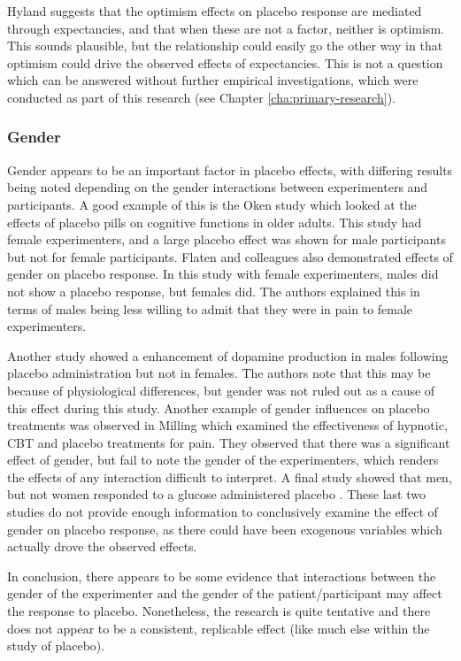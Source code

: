 Hyland suggests that the optimism effects on placebo response are mediated through expectancies, and that when these are not a factor, neither is optimism. This sounds plausible, but the relationship could easily go the other way in that optimism could drive the observed effects of expectancies. This is not a question which can be answered without further empirical investigations, which were conducted as part of this research (see Chapter \ref{cha:primary-research}). 

\subsubsection{Gender}
\label{sec:gender}

Gender appears to be an important factor in placebo effects, with differing results being noted depending on the gender interactions between experimenters and participants. A good example of this is the Oken \cite{Oken2008} study which looked at the  effects of placebo pills on cognitive functions in older adults. This study had female experimenters, and a large placebo effect was shown for male participants but not for female participants. Flaten and colleagues \cite{Flaten2006}  also demonstrated effects of gender on placebo response. In this study with female experimenters, males did not show a placebo response, but females did. The authors explained this in terms of males being less willing to admit that they were in pain to female experimenters.

 Another study \cite{Zubieta2006} showed a enhancement of dopamine production in males following placebo administration but not in females. The authors note that this may be because of physiological differences, but gender was not ruled out as a cause of this effect during this study. Another example of gender influences on placebo treatments was observed in Milling \cite{Milling2007}  which examined the effectiveness of hypnotic, CBT and placebo treatments for pain. They observed that there was a significant effect of gender, but fail to note the gender of the experimenters, which renders the effects of any interaction difficult to interpret. A final study showed that men, but not women responded to a glucose administered placebo \cite{Haltia2008}. These last two studies do not provide enough information to conclusively examine the effect of gender on placebo response, as there could have been exogenous variables which actually drove the observed effects. 

In conclusion, there appears to be some evidence that interactions between the gender of the experimenter and the gender of the patient/participant may affect the response to placebo. Nonetheless, the research is quite tentative and there does not appear to be a consistent, replicable effect (like much else within the study of placebo). 



